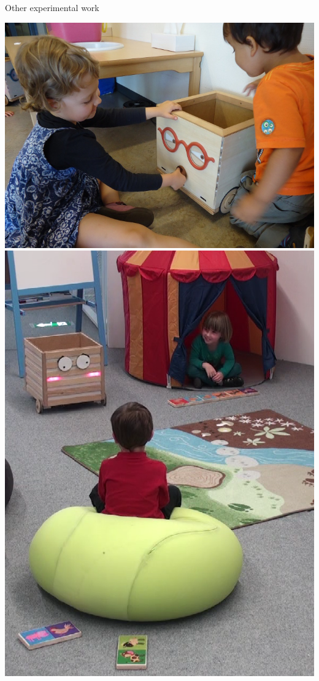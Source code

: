 \documentclass[compress]{beamer}
\begin{document}

\begin{frame}{Other experimental work}

            \hyperlink{croquignole}{\includegraphics[height=0.2\paperheight]{ranger/croquignole-single}}
            \hspace{0.5em}
            \hyperlink{dominos}{\includegraphics[height=0.2\paperheight]{ranger/domino-mistake}}

\end{frame}
\end{document}
